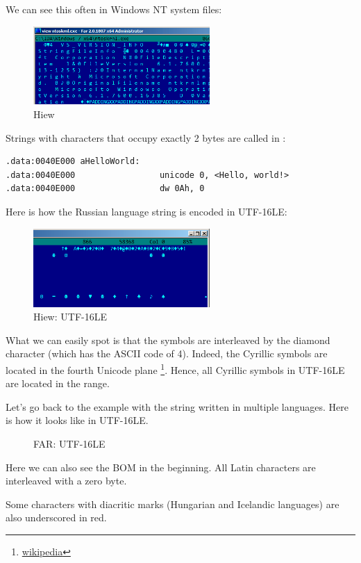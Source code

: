 We can see this often in \gls{Windows NT} system files:

\begin{figure}[H]
\centering
\includegraphics[width=0.6\textwidth]{digging_into_code/strings/ntoskrnl_UTF16.png}
\caption{Hiew}
\end{figure}

Strings with characters that occupy exactly 2 bytes are called  in \IDA:

\begin{lstlisting}
.data:0040E000 aHelloWorld:
.data:0040E000                 unicode 0, <Hello, world!>
.data:0040E000                 dw 0Ah, 0
\end{lstlisting}

Here is how the Russian language string is encoded in UTF-16LE:

\begin{figure}[H]
\centering
\includegraphics[width=0.6\textwidth]{digging_into_code/strings/russian_UTF16.png}
\caption{Hiew: UTF-16LE}
\end{figure}

What we can easily spot is that the symbols are interleaved by the diamond character (which has the ASCII code of 4).
Indeed, the Cyrillic symbols are located in the fourth Unicode plane
\footnote{\href{http://go.yurichev.com/17003}{wikipedia}}.
Hence, all Cyrillic symbols in UTF-16LE are located in the  range.

Let's go back to the example with the string written in multiple languages.
Here is how it looks like in UTF-16LE.

\begin{figure}[H]
\centering
{}
\caption{FAR: UTF-16LE}
\end{figure}

Here we can also see the \ac{BOM} in the beginning.
All Latin characters are interleaved with a zero byte.

Some characters with diacritic marks (Hungarian and Icelandic languages) are also underscored in red.



